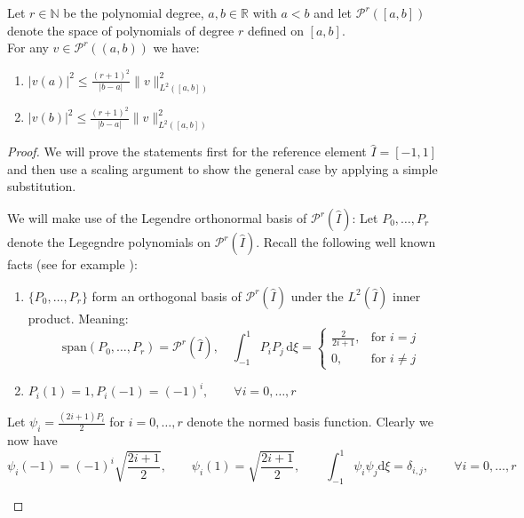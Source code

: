 \begin{lemma}
    \label{lemma:inv_ineq}
    Let $r\in \mathbb{N}$ be the polynomial degree, 
    $a,b\in \mathbb{R}$ with $a<b$ and let $\mathcal{P}^r([a,b])$ denote the 
    space of polynomials of degree $r$ defined on $[a,b]$. \\
    For any $v\in \mathcal{P}^r((a,b))$ we have:
    \begin{enumerate}
        \item $|v(a)|^2 \leq \frac{{(r+1)}^2}{|b-a|}\|v\|_{L^2([a,b])}^2$ 
        \item $|v(b)|^2 \leq \frac{{(r+1)}^2}{|b-a|}\|v\|_{L^2([a,b])}^2$
    \end{enumerate}
\end{lemma}
\begin{proof}
    We will prove the statements first for the reference element $\hat{I} = [-1,1]$ and then
    use a scaling argument to show the general case by applying a simple substitution. \\
    \begin{proofstep}[Setup]
        We will make 
        use of the Legendre orthonormal basis of $\mathcal{P}^r(\hat{I})$:
        Let $P_0,\ldots,P_r$ denote the Legegndre polynomials on  $\mathcal{P}^r(\hat{I})$. 
        Recall the following well known facts (see for example \cite{quarteroniNumericalMathematicSpringer2007}): 
        \begin{enumerate}
            \item $\{P_0,\ldots,P_r\}$ form an orthogonal basis of $\mathcal{P}^r(\hat{I})$ under the
            $L^2(\hat{I})$ inner product. Meaning:
            \[
            \text{span}(P_0,\ldots,P_r) = \mathcal{P}^r(\hat{I}),\quad \int_{-1}^{1} P_i P_j \,\text{d}\xi = 
            \begin{cases}
                \frac{2}{2i + 1}, &\text{for } i=j \\
                0, &\text{for } i\neq j   
            \end{cases} 
            \]    
            \item $P_i(1) = 1, P_i(-1) = {(-1)}^i, \qquad \forall i = 0,\ldots,r$
        \end{enumerate}
        Let $\psi_i = \frac{(2i + 1)P_i}{2}$ for $i=0,\ldots,r$ denote the normed 
        basis function. Clearly we now have 
        \[
            \psi_i(-1) = {(-1)}^i\sqrt{\frac{2i+1}{2}}, \qquad \psi_i(1) = \sqrt{\frac{2i+1}{2}}, 
            \qquad \int_{-1}^{1}\psi_i \psi_j \text{d}\xi = \delta_{i,j}, \qquad \forall i = 0,\ldots,r
\]
\end{proofstep}
\end{proof}
